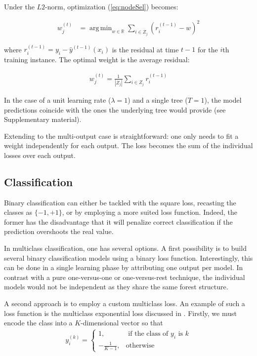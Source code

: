 \documentclass{article}
\DeclareMathOperator*{\argmin}{arg\,min}
\begin{document}
Under the $L2$-norm, optimization (\ref{eq:nodeSel}) becomes:

\vspace*{-\baselineskip}
\begin{align}\label{eq:L2min}
w_j^{(t)} &=  \argmin_{w \in \mathbb{R}} \sum_{i \in Z_j} \left(r_i^{(t-1)} - 
w\right)^2
\end{align}
\vspace*{-\baselineskip}

where $r_i^{(t-1)} = y_i - \hat{y}^{(t-1)}(x_i)$ is the residual at time $t-1$ 
for the $i$th training instance.
The optimal weight is the average residual:

\vspace*{-\baselineskip}
\begin{align}\label{eq:L2Solution}
w_j^{(t)} = \frac{1}{|Z_j|} \sum_{i \in Z_j} r_i^{(t-1)}
\end{align}
\vspace*{-\baselineskip}

In the case of a unit learning rate ($\lambda = 1$) and a single tree ($T=1$), 
the model predictions coincide with the ones the underlying tree would provide 
(see Supplementary material).

Extending to the multi-output case is straightforward: one only needs to fit a 
weight independently for each output. The loss becomes the sum of the 
individual losses over each output.

\subsection{Classification}
\label{subsec:classification}

Binary classification can either be tackled with the square loss, recasting the 
classes as $\{-1, +1\}$, or by employing a more suited loss function. Indeed, 
the former has the disadvantage that it will penalize correct classification if 
the prediction overshoots the real value.

In multiclass classification, one has several options. A first possibility is 
to build several binary classification models using a binary loss function. 
Interestingly, this can be done in a single learning phase by attributing one 
output per model. In contrast with a pure one-versus-one or one-versus-rest 
technique, the individual models would not be independent as they share the 
same forest structure.

A second approach is to employ a custom multiclass loss. An example of such a 
loss function is the multiclass exponential loss discussed in 
\cite{zhu2009multiadaboost}. Firstly, we must encode the class into a 
$K$-dimensional vector so that
\begin{align}\label{eq:MEencode}
y_i^{(k)} = \begin{cases}
1, &\text{ if the class of } y_i \text{ is } k \\
-\frac{1}{K-1}, &\text{otherwise}
\end{cases}
\end{align}
\vspace*{-\baselineskip}
\end{document}
